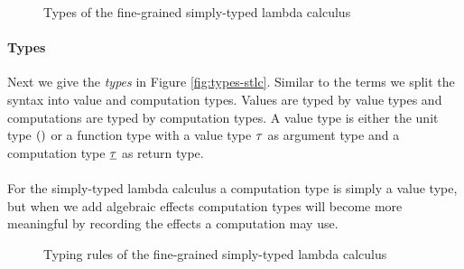 {\begin{figure}
\caption{Types of the fine-grained simply-typed lambda calculus}
\centering
\fbox{
\begin{minipage}{4 cm}
\begin{align*}
& \ty \Coloneqq \tunit \;|\; \tarr{\ty}{\cty} \\
& \cty \Coloneqq \ty
\end{align*}
\label{fig:types-stlc}
\end{minipage}
}
\end{figure}

\paragraph{Types}
Next we give the \emph{types} in Figure \ref{fig:types-stlc}.
Similar to the terms we split the syntax into value and computation types.
Values are typed by value types and computations are typed by computation types.
A value type is either the unit type $()$ or a function type with a value type $\tau$ as argument type and a computation type  $\underline{\tau}$ as return type.
\\\\
For the simply-typed lambda calculus a computation type is simply a value type, but when we add algebraic effects computation types will become more meaningful by recording the effects a computation may use.

\begin{figure}
\caption{Typing rules of the fine-grained simply-typed lambda calculus}
\centering
{}
\end{figure}

}
